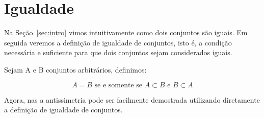 \section{Igualdade}

Na Seção~\ref{sec:intro} vimos intuitivamente como dois conjuntos são iguais. Em seguida veremos a definição de igualdade de conjuntos, isto é, a condição necessária e suficiente para que dois conjuntos sejam considerados iguais.

\begin{definition}
Sejam A e B conjuntos arbitrários, definimos:

	$$ A = B \text{ se e somente se } A \subset B \text{ e } B \subset A $$

\end{definition}

\begin{remark}
	Agora, nas  a antissimetria pode ser facilmente demostrada utilizando diretamente a definição de igualdade de conjuntos.
\end{remark}

